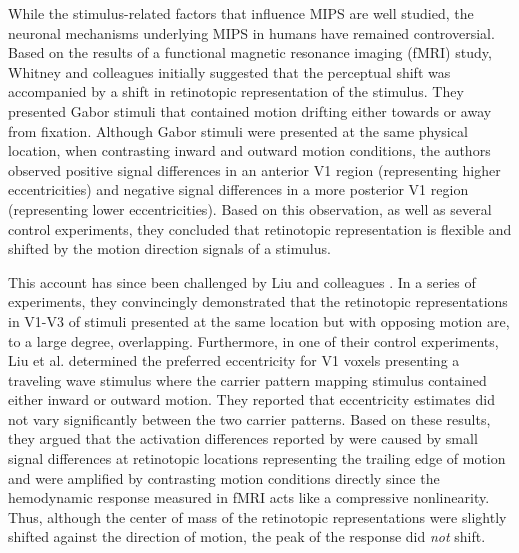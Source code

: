 While the stimulus-related factors that influence MIPS are well studied, the neuronal mechanisms underlying MIPS in humans have remained controversial. Based on the results of a functional magnetic resonance imaging (fMRI) study, Whitney and colleagues \parencite*{Whitney2003} initially suggested that the perceptual shift was accompanied by a shift in retinotopic representation of the stimulus. They presented Gabor stimuli that contained motion drifting either towards or away from fixation. Although Gabor stimuli were presented at the same physical location, when contrasting inward and outward motion conditions, the authors observed positive signal differences in an anterior V1 region (representing higher eccentricities) and negative signal differences in a more posterior V1 region (representing lower eccentricities). Based on this observation, as well as several control experiments, they concluded that retinotopic representation is flexible and shifted by the motion direction signals of a stimulus.

This account has since been challenged by Liu and colleagues \parencite*{Liu2006}. In a series of experiments, they convincingly demonstrated that the retinotopic representations in V1-V3 of stimuli presented at the same location but with opposing motion are, to a large degree, overlapping. Furthermore, in one of their control experiments, Liu et al. determined the preferred eccentricity for V1 voxels presenting a traveling wave stimulus where the carrier pattern mapping stimulus contained either inward or outward motion. They reported that eccentricity estimates did not vary significantly between the two carrier patterns. Based on these results, they argued that the activation differences reported by \cite{Whitney2002} were caused by small signal differences at retinotopic locations representing the trailing edge of motion and were amplified by contrasting motion conditions directly since the hemodynamic response measured in fMRI acts like a compressive nonlinearity. Thus, although the center of mass of the retinotopic representations were slightly shifted against the direction of motion, the peak of the response did \textit{not} shift.

